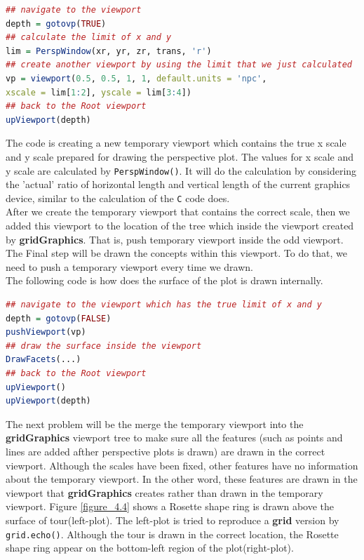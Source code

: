 \documentclass[paper=a4, fontsize=11pt]{report}
\begin{document}
\begin{lstlisting}[language = R]
## navigate to the viewport
depth = gotovp(TRUE) 
## calculate the limit of x and y
lim = PerspWindow(xr, yr, zr, trans, 'r')  
## create another viewport by using the limit that we just calculated
vp = viewport(0.5, 0.5, 1, 1, default.units = 'npc',
xscale = lim[1:2], yscale = lim[3:4]) 
## back to the Root viewport
upViewport(depth)  
\end{lstlisting}
The code is creating a new temporary viewport which contains the true x scale and y scale prepared for drawing the perspective plot. The values for x scale and y scale are calculated by \texttt{PerspWindow()}. It will do the calculation by considering the 'actual' ratio of horizontal length and vertical length of the current graphics device, similar to the calculation of the \texttt{C} code does.\\
After we create the temporary viewport that contains the correct scale, then we added this viewport to the location of the tree which inside the viewport created by \textbf{gridGraphics}. That is, push temporary viewport inside the odd viewport. The Final step will be drawn the concepts within this viewport. To do that, we need to push a temporary viewport every time we drawn.\\ 
The following code is how does the surface of the plot is drawn internally.
\begin{lstlisting}[language = R]
## navigate to the viewport which has the true limit of x and y
depth = gotovp(FALSE)
pushViewport(vp)
## draw the surface inside the viewport
DrawFacets(...)
## back to the Root viewport
upViewport()
upViewport(depth)
\end{lstlisting}

The next problem will be the merge the temporary viewport into the \textbf{gridGraphics} viewport tree to make sure all the features (such as points and lines are added afther perspective plots is drawn) are drawn in the correct viewport. Although the scales have been fixed, other features have no information about the temporary viewport. In the other word, these features are drawn in the viewport that \textbf{gridGraphics} creates rather than drawn in the temporary viewport. Figure \ref{figure_4.4} shows a Rosette shape ring is drawn above the surface of tour(left-plot). The left-plot is tried to reproduce a \textbf{grid} version by \texttt{grid.echo()}. Although the tour is drawn in the correct location, the Rosette shape ring appear on the bottom-left region of the plot(right-plot).
\end{document}
